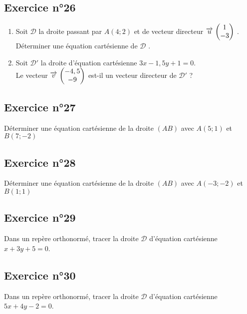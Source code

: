 \documentclass[12pt,a4paper]{article}
\begin{document}
\subsection*{Exercice n°26}

\begin{enumerate}
    \item Soit $\mathscr{D}$ la droite passant par $A(4;2)$ et de vecteur directeur $\overrightarrow{u}\, \begin{pmatrix} 1\\ -3 \end{pmatrix}$ .\\ Déterminer une équation cartésienne de $\mathscr{D}$ .
    \item Soit $\mathscr{D'}$ la droite d'équation cartésienne $3x-1,5y+1=0$.\\
    Le vecteur $\overrightarrow{v}\, \begin{pmatrix} -4,5\\ -9 \end{pmatrix}$ est-il un vecteur directeur de $\mathscr{D'}$ ?
\end{enumerate}

\subsection*{Exercice n°27}

Déterminer une équation cartésienne de la droite $(AB)$ avec $A(5;1)$ et $B(7;-2)$

\subsection*{Exercice n°28}

Déterminer une équation cartésienne de la droite $(AB)$ avec $A(-3;-2)$ et $B(1;1)$

\subsection*{Exercice n°29}
Dans un repère orthonormé, tracer la droite $\mathscr{D}$ d'équation cartésienne $x+3y+5=0$.

\subsection*{Exercice n°30}
Dans un repère orthonormé, tracer la droite $\mathscr{D}$ d'équation cartésienne $5x+4y-2=0$.
\end{document}
